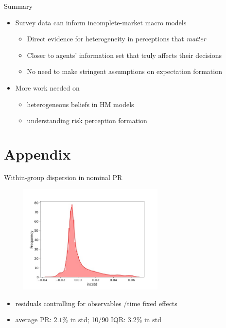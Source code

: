 \documentclass{beamer}
\begin{document}
\begin{frame}{Summary}
	
	\begin{itemize}
 	\item Survey data can inform incomplete-market macro models 
 	\begin{itemize}
 		\item Direct evidence for heterogeneity in perceptions that \textit{matter}
 		\item Closer to agents' information set that truly affects their decisions
 			\item No need to make stringent assumptions on expectation formation
 	\end{itemize}

	\item More work needed on 
	\begin{itemize}
		\item heterogeneous beliefs in HM models
		\item understanding risk perception formation  
	\end{itemize}
	\end{itemize}
\end{frame}





\section*{Appendix}



\begin{frame}{Within-group dispersion in nominal PR}
	\label{appendix:incstd}
	\begin{figure}
		\centering
		\includegraphics[width=0.65\textwidth]{figures/hist_incstd.jpg}
	\end{figure}
	\begin{itemize}
		\item  residuals controlling for observables /time fixed effects
		\item average PR:  $2.1\%$ in std; 10/90 IQR: $3.2\%$ in std \quad \hyperlink{rincstd_hist}{}    
	\end{itemize}
\end{frame}
\end{document}
